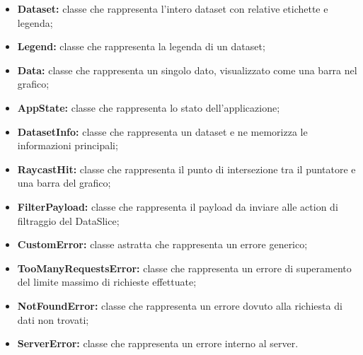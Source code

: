 \begin{itemize}
    \item \textbf{Dataset:} classe che rappresenta l'intero dataset con relative etichette e legenda;
    \item \textbf{Legend:} classe che rappresenta la legenda di un dataset;
    \item \textbf{Data:} classe che rappresenta un singolo dato, visualizzato come una barra nel grafico;
    \item \textbf{AppState:} classe che rappresenta lo stato dell'applicazione;
    \item \textbf{DatasetInfo:} classe che rappresenta un dataset e ne memorizza le informazioni principali;
    \item \textbf{RaycastHit:} classe che rappresenta il punto di intersezione tra il puntatore e una barra del grafico;
    \item \textbf{FilterPayload:} classe che rappresenta il payload da inviare alle action di filtraggio del DataSlice;
    \item \textbf{CustomError:} classe astratta che rappresenta un errore generico;
    \item \textbf{TooManyRequestsError:} classe che rappresenta un errore di superamento del limite massimo di richieste effettuate;
    \item \textbf{NotFoundError:} classe che rappresenta un errore dovuto alla richiesta di dati non trovati;
    \item \textbf{ServerError:} classe che rappresenta un errore interno al server.
\end{itemize}
